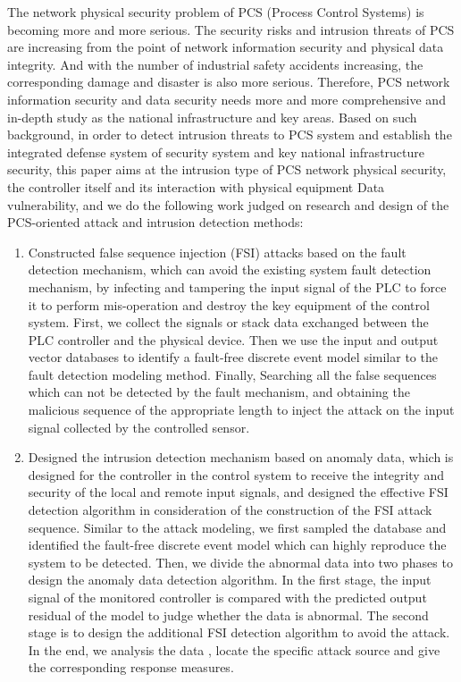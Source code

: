 \begin{englishabstract}
The network physical security problem of PCS (Process Control Systems) is becoming more and more serious. The security risks and intrusion threats of PCS are increasing from the point of network information security and physical data integrity. And with the number of industrial safety accidents increasing, the corresponding damage and disaster is also more serious. Therefore, PCS network information security and data security needs more and more comprehensive and in-depth study as the national infrastructure and key areas. Based on such background, in order to detect intrusion threats to PCS system and establish the integrated defense system of security system and key national infrastructure security, this paper aims at the intrusion type of PCS network physical security, the controller itself and its interaction with physical equipment Data vulnerability, and we do the following work judged on research and design of the PCS-oriented attack and intrusion detection methods:
\begin{enumerate}
\item Constructed false sequence injection (FSI) attacks based on the fault detection mechanism, which can avoid the existing system fault detection mechanism, by infecting and tampering the input signal of the PLC to force it to perform mis-operation and destroy the key equipment of the control system. First, we collect the signals or stack data exchanged between the PLC controller and the physical device. Then we use the input and output vector databases to identify a fault-free discrete event model similar to the fault detection modeling method. Finally, Searching all the false sequences which can not be detected by the fault mechanism, and obtaining the malicious sequence of the appropriate length to inject the attack on the input signal collected by the controlled sensor.
\item Designed the intrusion detection mechanism based on anomaly data, which is designed for the controller in the control system to receive the integrity and security of the local and remote input signals, and designed the effective FSI detection algorithm in consideration of the construction of the FSI attack sequence. Similar to the attack modeling, we first sampled the database and identified the fault-free discrete event model which can highly reproduce the system to be detected. Then, we divide the abnormal data into two phases to design the anomaly data detection algorithm. In the first stage, the input signal of the monitored controller is compared with the predicted output residual of the model to judge whether the data is abnormal. The second stage is to design the additional FSI detection algorithm to avoid the attack. In the end, we analysis the data , locate the specific attack source and give the corresponding response measures.

\end{enumerate}
\end{englishabstract}
